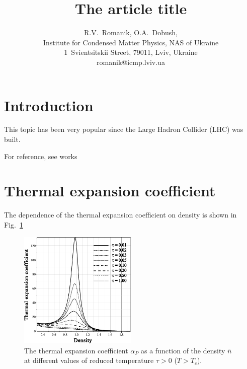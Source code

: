 \documentclass[12pt]{article}
\title{The article title}
\author{R.V.~Romanik, O.A.~Dobush,
	\\ \small Institute for Condensed Matter Physics, NAS of Ukraine 
	\\ \small 1~Svientsitskii Street, 79011, Lviv, Ukraine 
	\\ \small romanik@icmp.lviv.ua}
\begin{document}
	
	\maketitle
	
	
	\section{Introduction}
	This topic has been very popular since the Large Hadron Collider (LHC) was built.
	
	For reference, see works~\cite{Cooper}
	
	\section{Thermal expansion coefficient}
	The dependence of the thermal expansion coefficient on density is shown in Fig.~\ref{fig4}
	
	\begin{figure}[h!]
		\centering \includegraphics[width=0.5\textwidth]{f4.pdf}
		\vskip-3mm\caption{The thermal expansion coefficient $\alpha_P$ as a function of the density $\bar n$ at different values of reduced temperature $\tau > 0$ ($T > T_c$). 
		}\label{fig4}
	\end{figure}
	
	
	
\end{document}
